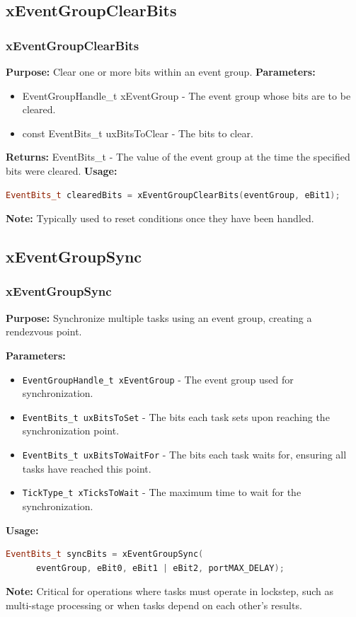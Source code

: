 \documentclass[10pt]{beamer}
\begin{document}
\subsection{xEventGroupClearBits}
\begin{frame}[fragile]
    \frametitle{xEventGroupClearBits}
    \textbf{Purpose:} Clear one or more bits within an event group.
    \textbf{Parameters:}
    \begin{itemize}
      \item EventGroupHandle\_t xEventGroup - The event group whose bits are to be cleared.
      \item const EventBits\_t uxBitsToClear - The bits to clear.
    \end{itemize}
    \textbf{Returns:} EventBits\_t - The value of the event group at the time the specified bits were cleared.
    \textbf{Usage:}
    \begin{lstlisting}[language=C++, basicstyle=\ttfamily\small]
  EventBits_t clearedBits = xEventGroupClearBits(eventGroup, eBit1);
    \end{lstlisting}
    \textbf{Note:} Typically used to reset conditions once they have been handled.
\end{frame}


\subsection{xEventGroupSync}
\begin{frame}[fragile]
    \frametitle{xEventGroupSync}
    \textbf{Purpose:} Synchronize multiple tasks using an event group, creating a rendezvous point.
  
    \textbf{Parameters:}
    \begin{itemize}
      \item \texttt{EventGroupHandle\_t xEventGroup} - The event group used for synchronization.
      \item \texttt{EventBits\_t uxBitsToSet} - The bits each task sets upon reaching the synchronization point.
      \item \texttt{EventBits\_t uxBitsToWaitFor} - The bits each task waits for, ensuring all tasks have reached this point.
      \item \texttt{TickType\_t xTicksToWait} - The maximum time to wait for the synchronization.
    \end{itemize}
    
    \textbf{Usage:}
    \begin{lstlisting}[language=C++, basicstyle=\ttfamily\small]
  EventBits_t syncBits = xEventGroupSync(
      eventGroup, eBit0, eBit1 | eBit2, portMAX_DELAY);
    \end{lstlisting}
    
    \textbf{Note:} Critical for operations where tasks must operate in lockstep, such as multi-stage processing or when tasks depend on each other's results.
  \end{frame}
\end{document}
